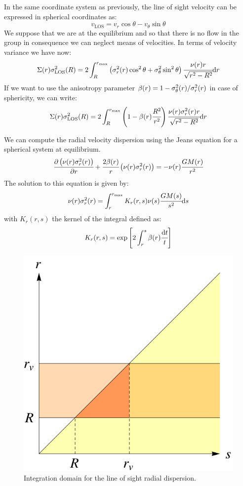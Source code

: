 In the same coordinate system as previously, the line of sight velocity can be
expressed in spherical coordinates as:
%
\begin{equation}
    v_{\mathrm{LOS}} = v_r \cos\theta - v_\theta \sin\theta
\end{equation}
%
We suppose that we are at the equilibrium and so that there is no flow in the
group in consequence we can neglect means of velocities. In terms of velocity
variance we have now:
%
\begin{equation}
    \Sigma(r)\sigma_{\mathrm{LOS}}^2(R) = 2\int_R^{r_{\max}}
    \left({\sigma_r^2(r)\cos^2\theta+\sigma_\theta^2\sin^2\theta}\right)
    \cfrac{\nu{(r)}{r}}{\sqrt{r^2-R^2}}{\rm{d}}{r}
\end{equation}
%
If we want to use the anisotropy parameter
$\beta(r)=1-\sigma_\theta^2(r)/\sigma_r^2(r)$ in case of sphericity, we can write:
%
\begin{equation}
    \Sigma(r)\sigma_{\mathrm{LOS}}^2(R) = 2\int_R^{r_{\max}}
    \left({1-\beta(r)\cfrac{R^2}{r^2}}\right)
    \cfrac{\nu{(r)}{\sigma_r^2(r)}{r}}{\sqrt{r^2-R^2}}{\rm{d}}{r}
\end{equation}

We can compute the radial velocity dispersion using the Jeans equation for a
spherical system at equilibrium.
%
\begin{equation}
    \cfrac{{\partial} \left(\nu(r)\sigma_r^2(r)\right)}{{\partial} r} + \cfrac{2\beta(r)}{r}\left(\nu(r)\sigma_r^2(r)\right)=
    -\nu(r)\cfrac{GM(r)}{r^2}
\end{equation}
%
The solution to this equation is given by:
%
\begin{equation}
    \nu(r)\sigma_r^2(r)=\int_r^{r_{\max}}K_r(r,s)\nu(s)\cfrac{GM(s)}{s^2}{\rm{d}}{s}
\end{equation}
%
with $K_r(r,s)$ the kernel of the integral defined as:
%
\begin{equation}
    K_r(r,s)=\exp\left[2\int_r^s\beta(r)\cfrac{{\rm{d}}{t}}{t}\right]
\end{equation}
%
\begin{figure}[H]
    \centering
    \includegraphics[width=0.5\linewidth]{figures/los_variance/domint}
    \caption{\footnotesize{}Integration domain for the line of sight radial dispersion.}
\label{fig:domint}
\end{figure}
%
